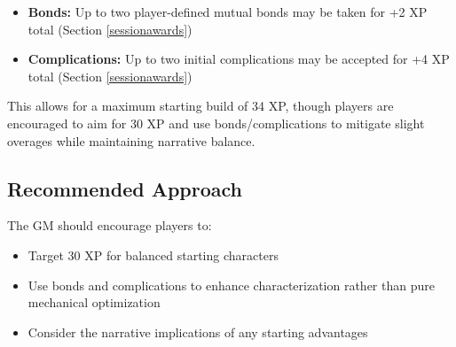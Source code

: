 \begin{itemize}
    \item \textbf{Bonds:} Up to two player-defined mutual bonds may be taken for +2 XP total (Section \ref{sessionawards})
    \item \textbf{Complications:} Up to two initial complications may be accepted for +4 XP total (Section \ref{sessionawards})
\end{itemize}

This allows for a maximum starting build of 34 XP, though players are encouraged to aim for 30 XP and use bonds/complications to mitigate slight overages while maintaining narrative balance.

\subsection{Recommended Approach}
The GM should encourage players to:
\begin{itemize}
    \item Target 30 XP for balanced starting characters
    \item Use bonds and complications to enhance characterization rather than pure mechanical optimization
    \item Consider the narrative implications of any starting advantages
\end{itemize}


